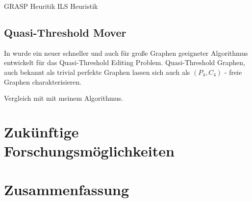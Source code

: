 \documentclass[12pt,a4paper,onecolumn,oneside,titlepage]{article}
\begin{document}
 GRASP Heuritik
 ILS Heuristik

\subsection{Quasi-Threshold Mover}
In \cite{BrandesHSW15} wurde ein neuer schneller und auch für große Graphen geeigneter Algorithmus entwickelt für das Quasi-Threshold Editing Problem. Quasi-Threshold Graphen, auch bekannt als trivial perfekte Graphen lassen sich auch als $(P_4, C_4)$ - freie Graphen charakterisieren. 


Vergleich mit mit meinem Algorithmus.


\section{Zukünftige Forschungsmöglichkeiten}
\section{Zusammenfassung}




\end{document}
